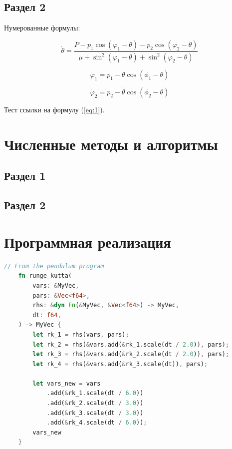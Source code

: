 \documentclass[a4paper,14pt]{extarticle}
\begin{document}
\subsection{Раздел 2}

Нумерованные формулы:

\begin{equation}
\label{eq:1}
    \dot{\theta}=\frac{P-p_{1}\cos\left(\varphi_{1}-\theta\right)-p_{2}\cos\left(\varphi_{2}-\theta\right)}{\mu+\sin^{2}\left(\varphi_{1}-\theta\right)+\sin^{2}\left(\varphi_{2}-\theta\right)}
\end{equation}

\begin{equation}
    \dot{\varphi}_{1}=p_{1}-\dot{\theta}\cos(\phi_{1}-\theta)
\end{equation}

\begin{equation}
    \dot{\varphi}_{2}=p_{2}-\dot{\theta}\cos(\phi_{2}-\theta)
\end{equation}

Тест ссылки на формулу (\ref{eq:1}).

\pagebreak
\section{Численные методы и алгоритмы}

\subsection{Раздел 1}

\subsection{Раздел 2}

\pagebreak
\section{Программная реализация}

\begin{lstlisting}[language=rust,caption={Программная реализация метода Рунге-Кутты},label={listing-1}]
    // From the pendulum program
    fn runge_kutta(
        vars: &MyVec,
        pars: &Vec<f64>,
        rhs: &dyn Fn(&MyVec, &Vec<f64>) -> MyVec,
        dt: f64,
    ) -> MyVec {
        let rk_1 = rhs(vars, pars);
        let rk_2 = rhs(&vars.add(&rk_1.scale(dt / 2.0)), pars);
        let rk_3 = rhs(&vars.add(&rk_2.scale(dt / 2.0)), pars);
        let rk_4 = rhs(&vars.add(&rk_3.scale(dt)), pars);
    
        let vars_new = vars
            .add(&rk_1.scale(dt / 6.0))
            .add(&rk_2.scale(dt / 3.0))
            .add(&rk_3.scale(dt / 3.0))
            .add(&rk_4.scale(dt / 6.0));
        vars_new
    }
    \end{lstlisting}
    
\end{document}
